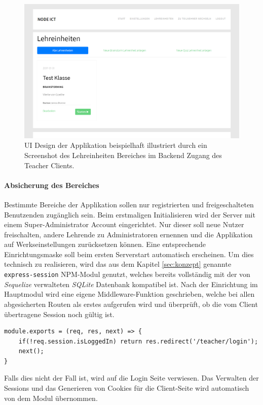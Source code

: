 \begin{figure}[h!]
	\centering
	\includegraphics[width=0.9\linewidth]{bilder/screenshot_lehreinheiten}
	\caption[Screenshot UI Design Lehreinheitenbereich]{UI Design der Applikation beispielhaft illustriert durch ein Screenshot des Lehreinheiten Bereiches im Backend Zugang des Teacher Clients.}
	\label{fig:screenshot_lehreinheiten}
\end{figure}

\paragraph{Absicherung des Bereiches}
Bestimmte Bereiche der Applikation sollen nur registrierten und freigeschalteten Benutzenden zugänglich sein. Beim erstmaligen Initialisieren wird der Server mit einem Super-Administrator Account eingerichtet. Nur dieser soll neue Nutzer freischalten, andere Lehrende zu Administratoren ernennen und die Applikation auf Werkseinstellungen zurücksetzen können. Eine entsprechende Einrichtungsmaske soll beim ersten Serverstart automatisch erscheinen. Um dies technisch zu realisieren, wird das aus dem Kapitel \ref{sec:konzept} genannte \texttt{express-session} NPM-Modul genutzt, welches bereits vollständig mit der von \emph{Sequelize} verwalteten \emph{SQLite} Datenbank kompatibel ist. Nach der Einrichtung im Hauptmodul wird eine eigene Middleware-Funktion geschrieben, welche bei allen abgesicherten Routen als erstes aufgerufen wird und überprüft, ob die vom Client übertragene Session noch gültig ist.
\begin{lstlisting}[caption=Code der Authentifizierungs Middleware]
module.exports = (req, res, next) => {
	if(!req.session.isLoggedIn) return res.redirect('/teacher/login');
	next();
}
\end{lstlisting}
Falls dies nicht der Fall ist, wird auf die Login Seite verwiesen. 
Das Verwalten der Sessions und das Generieren von Cookies für die Client-Seite wird automatisch von dem Modul übernommen.
